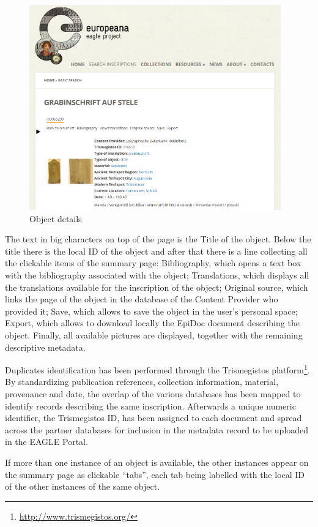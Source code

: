 \documentclass[amsthm,ebook]{saparticle}
\begin{document}
\begin{figure}[!bp]
\centering
\includegraphics[width=10.874cm,height=8.864cm]{EAGLE2016submissionXX-img004.png}
\caption{Object details}
\label{figure4}
\end{figure}

The text in big characters on top of the page is the Title of the object. Below the title there is the local ID of the
object and after that there is a line collecting all the clickable items of the summary page: Bibliography, which opens
a text box with the bibliography associated with the object; Translations, which displays all the translations
available for the inscription of the object; Original source, which links the page of the object in the database of the
Content Provider who provided it; Save, which allows to save the object in the user’s personal space; Export, which
allows to download locally the EpiDoc document describing the object. Finally, all available pictures are displayed,
together with the remaining descriptive metadata.

Duplicates identification has been performed through the Trismegistos platform\footnote{\url{http://www.trismegistos.org/}}.
By standardizing publication references, collection information, material, provenance and date, the overlap of the
various databases has been mapped to identify records describing the same inscription. Afterwards a unique numeric
identifier, the Trismegistos ID, has been assigned to each document and spread across the partner databases for
inclusion in the metadata record to be uploaded in the EAGLE Portal.

If more than one instance of an object is available, the other instances appear on the summary page as clickable ``tabs'',
each tab being labelled with the local ID of the other instances of the same object.
\end{document}
